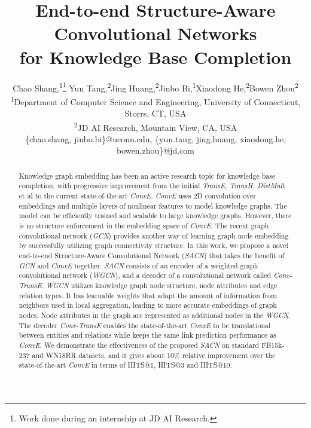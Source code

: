 \documentclass[letterpaper]{article} \usepackage{aaai19}  \usepackage{times}  \usepackage{helvet}  \usepackage{courier}  \usepackage{url}  \usepackage{graphicx}  \usepackage{amsmath}
\begin{document}
\title{End-to-end Structure-Aware Convolutional Networks \\for Knowledge Base Completion}

\def\wg{\textsuperscript{1}}
\def\ws{\textsuperscript{2}}

\author{Chao Shang,\wg \thanks{Work done during an internship at JD AI Research.}  Yun Tang,\ws \enspace  Jing Huang,\ws \enspace  Jinbo Bi,\wg \enspace  Xiaodong He,\ws \enspace  Bowen Zhou\ws\\
\wg Department of Computer Science and Engineering, University of Connecticut, Storrs, CT, USA\\
\ws JD AI Research, Mountain View, CA, USA\\
\{chao.shang, jinbo.bi\}@uconn.edu, \{yun.tang, jing.huang, xiaodong.he, bowen.zhou\}@jd.com
}
\maketitle
\begin{abstract}

Knowledge graph embedding has been an active research topic for knowledge base completion, with progressive improvement from the initial {\it TransE, TransH, DistMult} et al to the current state-of-the-art {\it ConvE}. {\it ConvE} uses 2D convolution over embeddings and multiple layers of nonlinear features to model knowledge graphs. The model can be efficiently trained and scalable to large knowledge graphs. However, there is no structure enforcement in the embedding space of {\it ConvE}. The recent graph convolutional network ({\it GCN}) provides another way of learning graph node embedding by successfully utilizing graph connectivity structure. In this work, we propose a novel end-to-end Structure-Aware Convolutional Network ({\it SACN}) that takes the benefit of {\it GCN} and {\it ConvE} together. {\it SACN} consists of an encoder of a weighted graph convolutional network ({\it WGCN}), and a decoder of a convolutional network called {\it Conv-TransE}. {\it WGCN} utilizes knowledge graph node structure, node attributes and edge relation types. It has learnable weights that adapt the amount of information from neighbors used in local aggregation, leading to more accurate embeddings of graph nodes. Node attributes in the graph are represented as additional nodes in the {\it WGCN}. The decoder {\it Conv-TransE} enables the state-of-the-art {\it ConvE} to be translational between entities and relations while keeps the same link prediction performance as {\it ConvE}. We demonstrate the effectiveness of the proposed {\it SACN} on standard FB15k-237 and WN18RR datasets, and it gives about 10\% relative improvement over the state-of-the-art {\it ConvE} in terms of HITS@1, HITS@3 and HITS@10.

\end{abstract}
\end{document}

